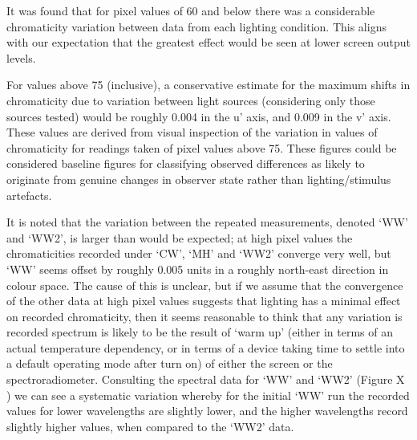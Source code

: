 


It was found that for pixel values of 60 and below there was a considerable chromaticity variation between data from each lighting condition. This aligns with our expectation that the greatest effect would be seen at lower screen output levels.



For values above 75 (inclusive), a conservative estimate for the maximum shifts in chromaticity due to variation between light sources (considering only those sources tested) would be roughly 0.004 in the u' axis, and 0.009 in the v' axis. These values are derived from visual inspection of the variation in values of chromaticity for readings taken of pixel values above 75. These figures could be considered baseline figures for classifying observed differences as likely to originate from genuine changes in observer state rather than lighting/stimulus artefacts.

It is noted that the variation between the repeated measurements, denoted `WW' and `WW2', is larger than would be expected; at high pixel values the chromaticities recorded under `CW', `MH' and `WW2' converge very well, but `WW' seems offset by roughly 0.005 units in a roughly north-east direction in colour space. The cause of this is unclear, but if we assume that the convergence of the other data at high pixel values suggests that lighting has a minimal effect on recorded chromaticity, then it seems reasonable to think that any variation is recorded spectrum is likely to be the result of `warm up' (either in terms of an actual temperature dependency, or in terms of a device taking time to settle into a default operating mode after turn on) of either the screen or the spectroradiometer. Consulting the spectral data for `WW' and `WW2' (Figure X%
) we can see a systematic variation whereby for the initial `WW' run the recorded values for lower wavelengths are slightly lower, and the higher wavelengths record slightly higher values, when compared to the `WW2' data.

